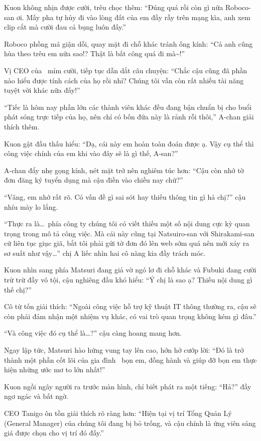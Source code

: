 \documentclass[../main.tex]{subfiles}
\begin{document}
Kuon không nhịn được cười, trêu chọc thêm: ``Đúng quá rồi còn gì nữa Roboco-san ơi. Mấy pha tự hủy đi vào lòng đất của em đầy rẫy trên mạng kìa, anh xem clip cắt mà cười đau cả bụng luôn đấy.''

Roboco phồng má giận dỗi, quay mặt đi chỗ khác tránh ống kính: ``Cả anh cũng hùa theo trêu em nữa sao!? Thật là bất công quá đi mà\~{}!''

Vị CEO của \hll\ mỉm cười, tiếp tục dẫn dắt câu chuyện: ``Chắc cậu cũng đã phần nào hiểu được tính cách của họ rồi nhỉ? Chúng tôi vẫn còn rất nhiều tài năng tuyệt vời khác nữa đấy!''

``Tiếc là hôm nay phần lớn các thành viên khác đều đang bận chuẩn bị cho buổi phát sóng trực tiếp của họ, nên chỉ có bốn đứa này là rảnh rỗi thôi,'' A-chan giải thích thêm.

Kuon gật đầu thấu hiểu: ``Dạ, cái này em hoàn toàn đoán được ạ. Vậy cụ thể thì công việc chính của em khi vào đây sẽ là gì thế, A-san?''

A-chan đẩy nhẹ gọng kính, nét mặt trở nên nghiêm túc hơn: ``Cậu còn nhớ tờ đơn đăng ký tuyển dụng mà cậu điền vào chiều nay chứ?''

``Vâng, em nhớ rất rõ. Có vấn đề gì sai sót hay thiếu thông tin gì hả chị?'' cậu nhíu mày lo lắng.

``Thực ra là\dots\ phía công ty chúng tôi có viết thiếu một số nội dung cực kỳ quan trọng trong mô tả công việc. Mà cái này cũng tại Natsuiro-san với Shirakami-san cứ liên tục giục giã, bắt tôi phải gửi tờ đơn đó lên web sớm quá nên mới xảy ra sơ suất như vậy\dots'' chị A liếc nhìn hai cô nàng kia đầy trách móc.

Kuon nhìn sang phía Matsuri đang giả vờ ngó lơ đi chỗ khác và Fubuki đang cười trừ trừ đầy vô tội, cậu nghiêng đầu khó hiểu: ``Ý chị là sao ạ? Thiếu nội dung gì thế chị?''

Cô từ tốn giải thích: ``Ngoài công việc hỗ trợ kỹ thuật IT thông thường ra, cậu sẽ còn phải đảm nhận một nhiệm vụ khác, có vai trò quan trọng không kém gì đâu.''

``Và công việc đó cụ thể là\dots?'' cậu càng hoang mang hơn.

Ngay lập tức, Matsuri hào hứng vung tay lên cao, hớn hở cướp lời: ``Đó là trở thành một phần cốt lõi của gia đình \hll\ bọn em, đồng hành và giúp đỡ bọn em thực hiện những ước mơ to lớn nhất!''

Kuon ngồi ngây người ra trước màn hình, chỉ biết phát ra một tiếng: ``Hả?'' đầy ngơ ngác và bất ngờ.

CEO Tanigo ôn tồn giải thích rõ ràng hơn: ``Hiện tại vị trí Tổng Quản Lý (General Manager) của chúng tôi đang bị bỏ trống, và cậu chính là ứng viên sáng giá được chọn cho vị trí đó đấy.''
\end{document}
